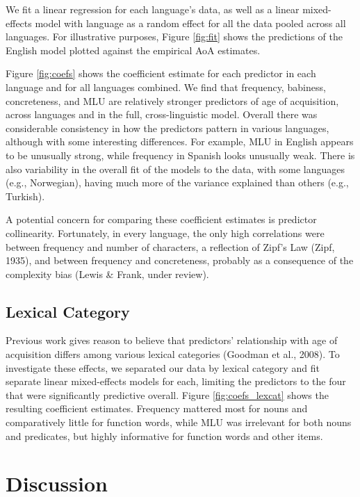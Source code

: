 \documentclass[10pt, letterpaper]{article}
\begin{document}
We fit a linear regression for each language's data, as well as a linear
mixed-effects model with language as a random effect for all the data
pooled across all languages. For illustrative purposes, Figure
\ref{fig:fit} shows the predictions of the English model plotted against
the empirical AoA estimates.

Figure \ref{fig:coefs} shows the coefficient estimate for each predictor
in each language and for all languages combined. We find that frequency,
babiness, concreteness, and MLU are relatively stronger predictors of
age of acquisition, across languages and in the full, cross-linguistic
model. Overall there was considerable consistency in how the predictors
pattern in various languages, although with some interesting
differences. For example, MLU in English appears to be unusually strong,
while frequency in Spanish looks unusually weak. There is also
variability in the overall fit of the models to the data, with some
languages (e.g., Norwegian), having much more of the variance explained
than others (e.g., Turkish).

A potential concern for comparing these coefficient estimates is
predictor collinearity. Fortunately, in every language, the only high
correlations were between frequency and number of characters, a
reflection of Zipf's Law (Zipf, 1935), and between frequency and
concreteness, probably as a consequence of the complexity bias (Lewis \&
Frank, under review).

\subsection{Lexical Category}\label{lexical-category}

Previous work gives reason to believe that predictors' relationship with
age of acquisition differs among various lexical categories (Goodman et
al., 2008). To investigate these effects, we separated our data by
lexical category and fit separate linear mixed-effects models for each,
limiting the predictors to the four that were significantly predictive
overall. Figure \ref{fig:coefs_lexcat} shows the resulting coefficient
estimates. Frequency mattered most for nouns and comparatively little
for function words, while MLU was irrelevant for both nouns and
predicates, but highly informative for function words and other items.

\section{Discussion}\label{discussion}
\end{document}
